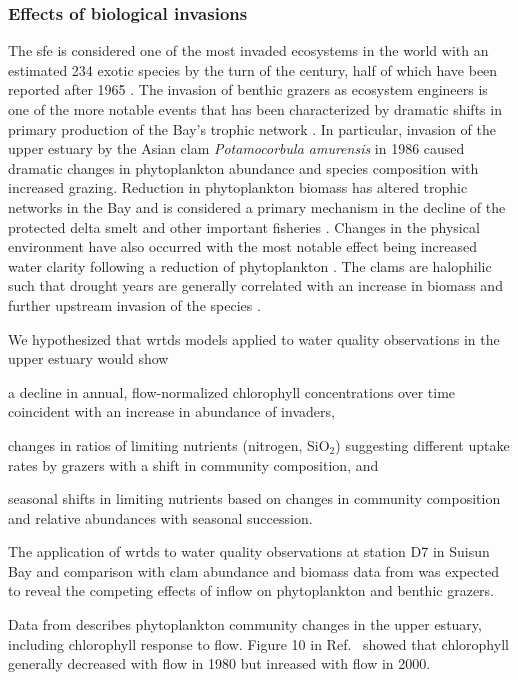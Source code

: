 \documentclass[journal = esthag, manuscript = article]{achemso}\usepackage[]{graphicx}\usepackage[]{color}
\begin{document}
\subsubsection{Effects of biological invasions}

The \acl{sfe} is considered one of the most invaded ecosystems in the world with an estimated 234 exotic species by the turn of the century, half of which have been reported after 1965 \cite{Cohen98}.  The invasion of benthic grazers as ecosystem engineers is one of the more notable events that has been characterized by dramatic shifts in primary production of the Bay's trophic network \cite{Carlton90,Nichols90,Werner93,Crauder16}.  In particular, invasion of the upper estuary by the Asian clam \textit{Potamocorbula amurensis} in 1986 caused dramatic changes in phytoplankton abundance and species composition with increased grazing.  Reduction in phytoplankton biomass has altered trophic networks in the Bay and is considered a primary mechanism in the decline of the protected delta smelt and other important fisheries \cite{Feyrer03,MacNally10}.  Changes in the physical environment have also occurred with the most notable effect being increased water clarity following a reduction of phytoplankton \cite{MacNally10}. The clams are halophilic such that drought years are generally correlated with an increase in biomass and further upstream invasion of the species \cite{Parchaso02,Cloern12b}.

We hypothesized that \ac{wrtds} models applied to water quality observations in the upper estuary would show \begin{inparaenum}[1\upshape)]
\item a decline in annual, flow-normalized chlorophyll concentrations over time coincident with an increase in abundance of invaders, 
\item changes in ratios of limiting nutrients (nitrogen, SiO$_2$) suggesting different uptake rates by grazers with a shift in community composition, and 
\item seasonal shifts in limiting nutrients based on changes in community composition and relative abundances with seasonal succession. 
\end{inparaenum}
The application of \ac{wrtds} to water quality observations at station D7 in Suisun Bay and comparison with clam abundance and biomass data from \cite{Crauder16} was expected to reveal the competing effects of inflow on phytoplankton and benthic grazers.

Data from \cite{Crauder16,Jassby08} describes phytoplankton community changes in the upper estuary, including chlorophyll response to flow.  Figure 10 in Ref.~ showed that chlorophyll generally decreased with flow in 1980 but inreased with flow in 2000.
\end{document}
